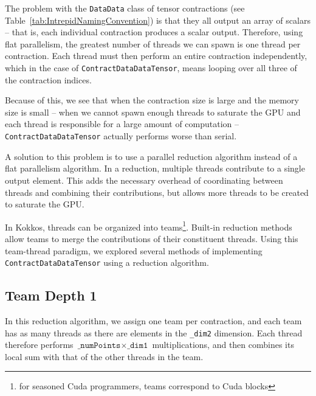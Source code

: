 The problem with the \texttt{DataData} class of tensor contractions (see
Table~\ref{tab:IntrepidNamingConvention}) is that they all output an array of
scalars -- that is, each individual contraction produces a scalar output.
Therefore, using flat parallelism, the greatest number of threads we can spawn
is one thread per contraction.  Each thread must then perform an entire
contraction independently, which in the case of
\texttt{ContractDataDataTensor}, means looping over all three of the
contraction indices.

Because of this, we see that when the contraction size is large and the memory
size is small -- when we cannot spawn enough threads to saturate the GPU and
each thread is responsible for a large amount of computation --
\texttt{ContractDataDataTensor} actually performs worse than serial.

A solution to this problem is to use a parallel reduction algorithm instead of
a flat parallelism algorithm.  In a reduction, multiple threads contribute to a
single output element.  This adds the necessary overhead of coordinating between
threads and combining their contributions, but allows more threads to be created
to saturate the GPU.

In Kokkos, threads can be organized into teams\footnote{for seasoned Cuda
programmers, teams correspond to Cuda blocks}.  Built-in reduction methods allow
teams to merge the contributions of their constituent threads.
Using this team-thread paradigm, we explored several methods of implementing
\texttt{ContractDataDataTensor} using a reduction algorithm.

\subsection{Team Depth 1}
    In this reduction algorithm, we assign one team per contraction, and each
    team has as many threads as there are elements in the \texttt{\_dim2}
    dimension.  Each thread therefore performs 
    $\texttt{\_numPoints} \times \texttt{\_dim1}$ multiplications, and then
    combines its local sum with that
    of the other threads in the team.


